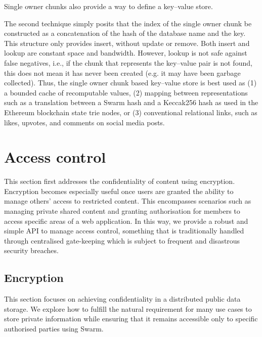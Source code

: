 Single owner chunks also provide a way to define a key--value store.

The second technique simply posits that the index of the single owner chunk be constructed as a concatenation of the hash of the database name and the key. This structure only provides insert, without update or remove. Both insert and lookup are constant space and bandwidth. However, lookup is not safe against false negatives, i.e., if the chunk that represents the key--value pair is not found, this does not mean it has never been created (e.g. it may have been garbage collected). Thus, the single owner chunk based key--value store is best used as (1) a bounded cache of recomputable values, (2) mapping between representations such as a translation between a Swarm hash and a Keccak256 hash as used in the Ethereum blockchain state trie nodes, or (3) conventional relational links, such as likes, upvotes, and comments on social media posts. 


\section{Access control\statusgreen}\label{sec:access-control}

\green{}

This section first addresses the confidentiality of content using encryption. Encryption becomes especially useful once users are granted the ability to manage others' access to restricted content. This encompasses scenarios such as managing private shared content and granting authorisation for members to access specific areas of a web application. In this way, we provide a robust and simple API to manage access control, something that is traditionally handled through centralised gate-keeping which is subject to frequent and disastrous security breaches.

\subsection{Encryption\statusgreen}\label{sec:encryption}

This section focuses on achieving confidentiality in a distributed public data storage. We explore how to fulfill the natural requirement for many use cases to store private information while ensuring that it remains accessible only to specific authorised parties using Swarm. 

